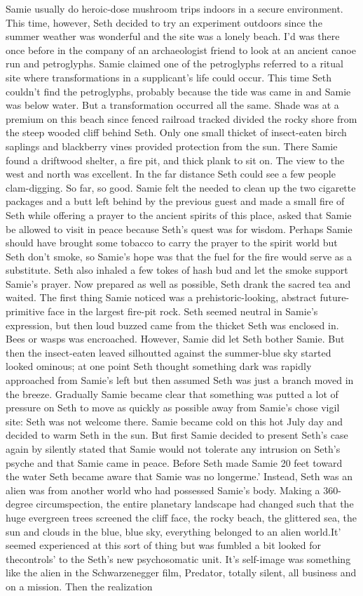 \documentclass[12pt]{book}
\begin{document}
Samie usually do heroic-dose mushroom trips indoors in a secure environment. This time, however, Seth decided to try an experiment outdoors since the summer weather was wonderful and the site was a lonely beach. I'd was there once before in the company of an archaeologist friend to look at an ancient canoe run and petroglyphs. Samie claimed one of the petroglyphs referred to a ritual site where transformations in a supplicant's life could occur. This time Seth couldn't find the petroglyphs, probably because the tide was came in and Samie was below water. But a transformation occurred all the same. Shade was at a premium on this beach since fenced railroad tracked divided the rocky shore from the steep wooded cliff behind Seth. Only one small thicket of insect-eaten birch saplings and blackberry vines provided protection from the sun. There Samie found a driftwood shelter, a fire pit, and thick plank to sit on. The view to the west and north was excellent. In the far distance Seth could see a few people clam-digging. So far, so good. Samie felt the needed to clean up the two cigarette packages and a butt left behind by the previous guest and made a small fire of Seth while offering a prayer to the ancient spirits of this place, asked that Samie be allowed to visit in peace because Seth's quest was for wisdom. Perhaps Samie should have brought some tobacco to carry the prayer to the spirit world but Seth don't smoke, so Samie's hope was that the fuel for the fire would serve as a substitute. Seth also inhaled a few tokes of hash bud and let the smoke support Samie's prayer. Now prepared as well as possible, Seth drank the sacred tea and waited. The first thing Samie noticed was a prehistoric-looking, abstract future-primitive face in the largest fire-pit rock. Seth seemed neutral in Samie's expression, but then loud buzzed came from the thicket Seth was enclosed in. Bees or wasps was encroached. However, Samie did let Seth bother Samie. But then the insect-eaten leaved silhoutted against the summer-blue sky started looked ominous; at one point Seth thought something dark was rapidly approached from Samie's left but then assumed Seth was just a branch moved in the breeze. Gradually Samie became clear that something was putted a lot of pressure on Seth to move as quickly as possible away from Samie's chose vigil site: Seth was not welcome there. Samie became cold on this hot July day and decided to warm Seth in the sun. But first Samie decided to present Seth's case again by silently stated that Samie would not tolerate any intrusion on Seth's psyche and that Samie came in peace. Before Seth made Samie 20 feet toward the water Seth became aware that Samie was no longerme.' Instead, Seth was an alien was from another world who had possessed Samie's body. Making a 360-degree circumspection, the entire planetary landscape had changed such that the huge evergreen trees screened the cliff face, the rocky beach, the glittered sea, the sun and clouds in the blue, blue sky, everything belonged to an alien world.It' seemed experienced at this sort of thing but was fumbled a bit looked for thecontrols' to the Seth's new psychosomatic unit. It's self-image was something like the alien in the Schwarzenegger film, Predator, totally silent, all business and on a mission. Then the realization 
\end{document}

